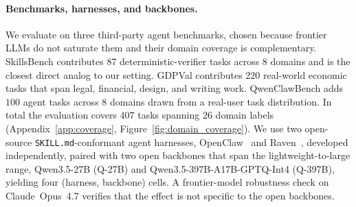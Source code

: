 \paragraph{Benchmarks, harnesses, and backbones.}
We evaluate on three third-party agent benchmarks, chosen
because frontier LLMs do not saturate them and their domain
coverage is complementary.  SkillsBench \citep{SkillsBench2026}
contributes $87$ deterministic-verifier tasks across $8$
domains and is the closest direct analog to our setting.
GDPVal \citep{OpenAIGDPVal2025} contributes $220$ real-world
economic tasks that span legal, financial, design, and writing
work.  QwenClawBench \citep{QwenClawBench2026} adds $100$ agent
tasks across $8$ domains drawn from a real-user task
distribution.
In total the evaluation covers $407$ tasks spanning $26$
domain labels (Appendix~\ref{app:coverage},
Figure~\ref{fig:domain_coverage}).
We use two
open-source \texttt{SKILL.md}-conformant agent harnesses,
OpenClaw~\citep{OpenClaw2025} and Raven~\citep{Raven2026},
developed independently, paired with two open backbones that
span the lightweight-to-large range, Qwen3.5-27B (Q-27B) and
Qwen3.5-397B-A17B-GPTQ-Int4 (Q-397B), yielding four
(harness, backbone) cells.  A frontier-model robustness check on
Claude~Opus~4.7 verifies that the effect
is not specific to the open backbones.

